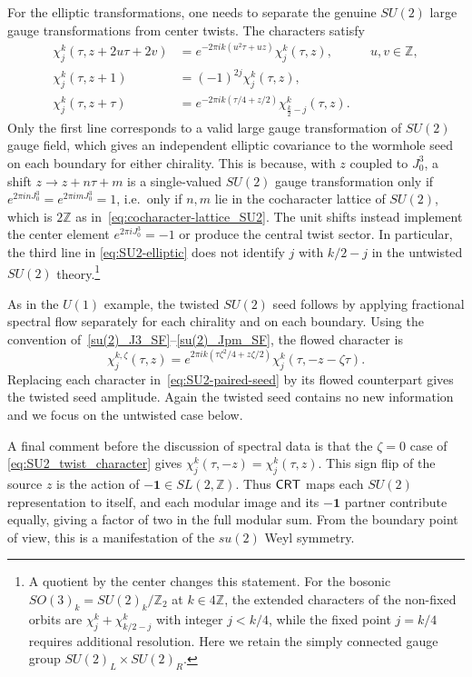 \documentclass[11pt]{article}
\numberwithin{equation}{section}
\begin{document}
For the elliptic transformations, one needs to separate the genuine $SU(2)$ large gauge transformations from center twists. The characters satisfy
\begin{equation}
\begin{aligned}
 \chi_j^k(\tau,z+2u\tau+2v)
 &=e^{-2\pi i k(u^2\tau+uz)}\chi_j^k(\tau,z),
 &&u,v\in\mathbb Z,\\
 \chi_j^k(\tau,z+1)&=(-1)^{2j}\chi_j^k(\tau,z),\\
 \chi_j^k(\tau,z+\tau)
 &=e^{-2\pi i k(\tau/4+z/2)}\chi_{\frac{k}{2}-j}^k(\tau,z).
\end{aligned}
\label{eq:SU2-elliptic}
\end{equation}
Only the first line corresponds to a valid large gauge transformation of $SU(2)$ gauge field, which gives an independent elliptic covariance to the wormhole seed on each boundary for either chirality.
This is because, with $z$ coupled to $J^3_0$, a
shift $z\to z+n\tau+m$ is a single-valued $SU(2)$ gauge transformation only if
$e^{2\pi i nJ^3_0}=e^{2\pi i mJ^3_0}=1$, i.e.\ only if $n,m$ lie in the cocharacter
lattice of $SU(2)$, which is $2\mathbb Z$  as in~\eqref{eq:cocharacter-lattice_SU2}.
 The unit shifts instead implement the center element $e^{2\pi iJ^3_0}=-1$ or produce the central twist sector. In particular, the third line in \eqref{eq:SU2-elliptic} does not identify $j$ with $k/2-j$ in the untwisted $SU(2)$ theory.\footnote{ A quotient by the center changes this statement. For the bosonic $SO(3)_k=SU(2)_k/\mathbb{Z}_2$
 at $k\in4\mathbb Z$, the extended characters of the non-fixed orbits are
$\chi_j^k+\chi_{k/2-j}^k$ with integer $j<k/4$, while the fixed point $j=k/4$ requires additional
resolution. Here we retain the simply connected gauge group $SU(2)_L\times SU(2)_R$.}

As in the $U(1)$ example, the twisted $SU(2)$ seed follows by applying fractional spectral flow separately for each chirality and on each boundary. Using the convention of~\eqref{su(2)_J3_SF}--\eqref{su(2)_Jpm_SF}, the flowed character is
\begin{equation}
\chi_j^{k,\zeta}(\tau,z)
 =e^{2\pi i k(\tau\zeta^2/4+z\zeta/2)}
 \chi_j^k(\tau,-z-\zeta\tau).
 \label{eq:SU2_twist_character}
\end{equation}
Replacing each character in~\eqref{eq:SU2-paired-seed} by its flowed counterpart gives the twisted seed amplitude. Again the twisted seed contains no new information and we focus on the untwisted case below.

A final comment before the discussion of spectral data is that the $\zeta=0$ case of \eqref{eq:SU2_twist_character} gives $\chi_j^k(\tau,-z)=\chi_j^k(\tau,z)$. This sign
flip of the source $z$ is the action of $-\mathbf 1\in SL(2,\mathbb Z)$. Thus $\mathsf{CRT}$ maps each $SU(2)$ representation to itself, and each modular image and its $-\mathbf1$ partner contribute equally, giving a factor of two in the full modular sum. From the boundary point of view, this is a manifestation of the $su(2)$ Weyl symmetry.
\end{document}
